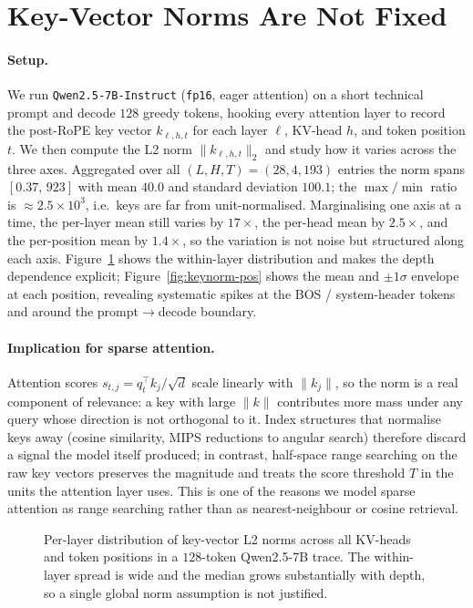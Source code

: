 \section{Key-Vector Norms Are Not Fixed}
\label{app:key-norms}

\paragraph{Setup.}
We run \texttt{Qwen2.5-7B-Instruct} (\texttt{fp16}, eager attention) on a
short technical prompt and decode $128$ greedy tokens, hooking every
attention layer to record the post-RoPE key vector $k_{\ell,h,t}$ for each
layer $\ell$, KV-head $h$, and token position $t$. We then compute the L2
norm $\|k_{\ell,h,t}\|_2$ and study how it varies across the three axes.
Aggregated over all $(L,H,T)=(28,4,193)$ entries the norm spans
$[0.37,\,923]$ with mean $40.0$ and standard deviation $100.1$; the
$\max/\min$ ratio is $\approx 2.5\times 10^{3}$, i.e.\ keys are far from
unit-normalised. Marginalising one axis at a time, the per-layer mean still
varies by $17\times$, the per-head mean by $2.5\times$, and the per-position
mean by $1.4\times$, so the variation is not noise but structured along each
axis. Figure~\ref{fig:keynorm-box} shows the within-layer distribution and
makes the depth dependence explicit; Figure~\ref{fig:keynorm-pos} shows the
mean and $\pm 1\sigma$ envelope at each position, revealing systematic
spikes at the BOS / system-header tokens and around the
prompt$\rightarrow$decode boundary.

\paragraph{Implication for sparse attention.}
Attention scores $s_{t,j} = q_t^\top k_j / \sqrt{d}$ scale linearly with
$\|k_j\|$, so the norm is a real component of relevance: a key with large
$\|k\|$ contributes more mass under any query whose direction is not
orthogonal to it. Index structures that normalise keys away (cosine
similarity, MIPS reductions to angular search) therefore discard a signal
the model itself produced; in contrast, half-space range searching on the
raw key vectors preserves the magnitude and treats the score threshold $T$
in the units the attention layer uses. This is one of the reasons we model
sparse attention as range searching rather than as nearest-neighbour or
cosine retrieval.

\begin{figure}[h]
  \centering
  \caption{Per-layer distribution of key-vector L2 norms across all KV-heads
  and token positions in a $128$-token Qwen2.5-7B trace. The within-layer
  spread is wide and the median grows substantially with depth, so a single
  global norm assumption is not justified.}
  \label{fig:keynorm-box}
\end{figure}

